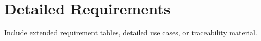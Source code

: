 \chapter{Detailed Requirements}
Include extended requirement tables, detailed use cases, or traceability material.
